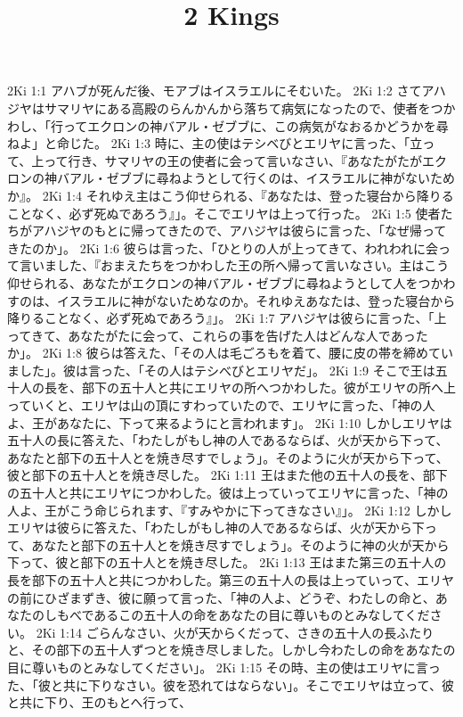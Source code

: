 

\title{2 Kings}

2Ki 1:1  アハブが死んだ後、モアブはイスラエルにそむいた。
2Ki 1:2  さてアハジヤはサマリヤにある高殿のらんかんから落ちて病気になったので、使者をつかわし、「行ってエクロンの神バアル・ゼブブに、この病気がなおるかどうかを尋ねよ」と命じた。
2Ki 1:3  時に、主の使はテシベびとエリヤに言った、「立って、上って行き、サマリヤの王の使者に会って言いなさい、『あなたがたがエクロンの神バアル・ゼブブに尋ねようとして行くのは、イスラエルに神がないためか』。
2Ki 1:4  それゆえ主はこう仰せられる、『あなたは、登った寝台から降りることなく、必ず死ぬであろう』」。そこでエリヤは上って行った。
2Ki 1:5  使者たちがアハジヤのもとに帰ってきたので、アハジヤは彼らに言った、「なぜ帰ってきたのか」。
2Ki 1:6  彼らは言った、「ひとりの人が上ってきて、われわれに会って言いました、『おまえたちをつかわした王の所へ帰って言いなさい。主はこう仰せられる、あなたがエクロンの神バアル・ゼブブに尋ねようとして人をつかわすのは、イスラエルに神がないためなのか。それゆえあなたは、登った寝台から降りることなく、必ず死ぬであろう』」。
2Ki 1:7  アハジヤは彼らに言った、「上ってきて、あなたがたに会って、これらの事を告げた人はどんな人であったか」。
2Ki 1:8  彼らは答えた、「その人は毛ごろもを着て、腰に皮の帯を締めていました」。彼は言った、「その人はテシべびとエリヤだ」。
2Ki 1:9  そこで王は五十人の長を、部下の五十人と共にエリヤの所へつかわした。彼がエリヤの所へ上っていくと、エリヤは山の頂にすわっていたので、エリヤに言った、「神の人よ、王があなたに、下って来るようにと言われます」。
2Ki 1:10  しかしエリヤは五十人の長に答えた、「わたしがもし神の人であるならば、火が天から下って、あなたと部下の五十人とを焼き尽すでしょう」。そのように火が天から下って、彼と部下の五十人とを焼き尽した。
2Ki 1:11  王はまた他の五十人の長を、部下の五十人と共にエリヤにつかわした。彼は上っていってエリヤに言った、「神の人よ、王がこう命じられます、『すみやかに下ってきなさい』」。
2Ki 1:12  しかしエリヤは彼らに答えた、「わたしがもし神の人であるならば、火が天から下って、あなたと部下の五十人とを焼き尽すでしょう」。そのように神の火が天から下って、彼と部下の五十人とを焼き尽した。
2Ki 1:13  王はまた第三の五十人の長を部下の五十人と共につかわした。第三の五十人の長は上っていって、エリヤの前にひざまずき、彼に願って言った、「神の人よ、どうぞ、わたしの命と、あなたのしもべであるこの五十人の命をあなたの目に尊いものとみなしてください。
2Ki 1:14  ごらんなさい、火が天からくだって、さきの五十人の長ふたりと、その部下の五十人ずつとを焼き尽しました。しかし今わたしの命をあなたの目に尊いものとみなしてください」。
2Ki 1:15  その時、主の使はエリヤに言った、「彼と共に下りなさい。彼を恐れてはならない」。そこでエリヤは立って、彼と共に下り、王のもとへ行って、
